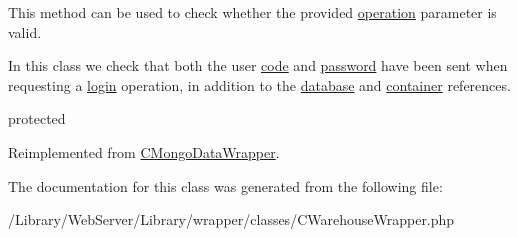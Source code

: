 This method can be used to check whether the provided \hyperlink{}{operation} parameter is valid.

In this class we check that both the user \hyperlink{}{code} and \hyperlink{}{password} have been sent when requesting a \hyperlink{}{login} operation, in addition to the \hyperlink{}{database} and \hyperlink{}{container} references.

protected 

Reimplemented from \hyperlink{class_c_mongo_data_wrapper_a406b81115b5f3957e6d40ee49ae85a13}{C\-Mongo\-Data\-Wrapper}.



The documentation for this class was generated from the following file\-:\begin{DoxyCompactItemize}
\item 
/\-Library/\-Web\-Server/\-Library/wrapper/classes/C\-Warehouse\-Wrapper.\-php\end{DoxyCompactItemize}
